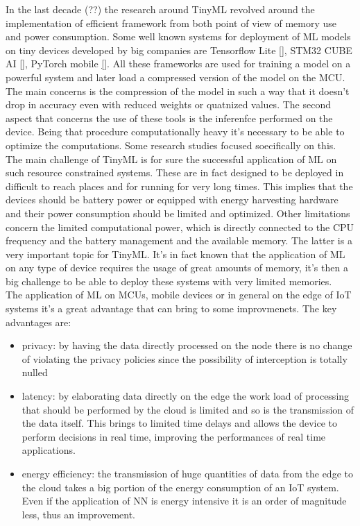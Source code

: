 \documentclass[12pt]{report}
\begin{document}
In the last decade (??) the research around TinyML revolved around the implementation of efficient framework from both point of view of memory use and power consumption. Some well known systems for deployment of ML models on tiny devices developed by big companies are Tensorflow Lite \ref{}, STM32 CUBE AI \ref{}, PyTorch mobile \ref{}. All these frameworks are used for training a model on a powerful system and later load a compressed version of the model on the MCU. The main concerns is the compression of the model in such a way that it doesn't drop in accuracy even with reduced weights or quatnized values. The second aspect that concerns the use of these tools is the inferenfce performed on the device. Being that procedure computationally heavy it's necessary to be able to optimize the computations. Some research studies focused soecifically on this.\\






The main challenge of TinyML is for sure the successful application of ML on such resource constrained systems. These are in fact designed to be deployed in difficult to reach places and for running for very long times. This implies that the devices should be battery power or equipped with energy harvesting hardware and their power consumption should be limited and optimized. Other limitations concern the limited computational power, which is directly connected to the CPU frequency and the battery management and the available memory. The latter is a very important topic for TinyML. It's in fact known that the application of ML on any type of device requires the usage of great amounts of memory, it's then a big challenge to be able to deploy these systems with very limited memories.\\
The application of ML on MCUs, mobile devices or in general on the edge of IoT systems it's a great advantage that can bring to some improvmenets. The key advantages are:
\begin{itemize}
\item privacy: by having the data directly processed on the node there is no change of violating the privacy policies since the possibility of interception is totally nulled
\item latency: by elaborating data directly on the edge the work load of processing that should be performed by the cloud is limited and so is the transmission of the data itself. This brings to limited time delays and allows the device to perform decisions in real time, improving the performances of real time applications.
\item energy efficiency: the transmission of huge quantities of data from the edge to the cloud takes a big portion of the energy consumption of an IoT system. Even if the application of NN is energy intensive it is an order of magnitude less, thus an improvement.
\end{itemize}
\end{document}
